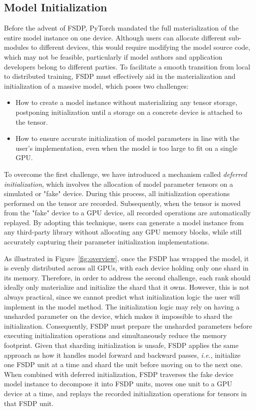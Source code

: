 
\subsection{Model Initialization}

Before the advent of FSDP, PyTorch mandated the full materialization of the entire model instance on one device. Although users can allocate different sub-modules to different devices, this would require modifying the model source code, which may not be feasible, particularly if model authors and application developers belong to different parties. To facilitate a smooth transition from local to distributed training, FSDP must effectively aid in the materialization and initialization of a massive model, which poses two challenges:

\begin{itemize}
    \item How to create a model instance without materializing any tensor storage, postponing initialization until a storage on a concrete device is attached to the tensor.
    \item How to ensure accurate initialization of model parameters in line with the user's implementation, even when the model is too large to fit on a single GPU. 
\end{itemize}

To overcome the first challenge, we have introduced a mechanism called \emph{deferred initialization}, which involves the allocation of model parameter tensors on a simulated or "fake" device. During this process, all initialization operations performed on the tensor are recorded. Subsequently, when the tensor is moved from the "fake" device to a GPU device, all recorded operations are automatically replayed. By adopting this technique, users can generate a model instance from any third-party library without allocating any GPU memory blocks, while still accurately capturing their parameter initialization implementations.

As illustrated in Figure~\ref{fig:overview}, once the FSDP has wrapped the model, it is evenly distributed across all GPUs, with each device holding only one shard in its memory. Therefore, in order to address the second challenge, each rank should ideally only materialize and initialize the shard that it owns. However, this is not always practical, since we cannot predict what initialization logic the user will implement in the model  method. The initialization logic may rely on having a unsharded parameter on the device, which makes it impossible to shard the initialization. Consequently, FSDP must prepare the unsharded parameters before executing  initialization operations and simultaneously reduce the memory footprint. Given that sharding initialization is unsafe, FSDP applies the same approach as how it handles model forward and backward passes, \emph{i.e.}, initialize one FSDP unit at a time and shard the unit before moving on to the next one. When combined with deferred initialization, FSDP traverses the fake device model instance to decompose it into FSDP units, moves one unit to a GPU device at a time, and replays the recorded initialization operations for tensors in that FSDP unit.





